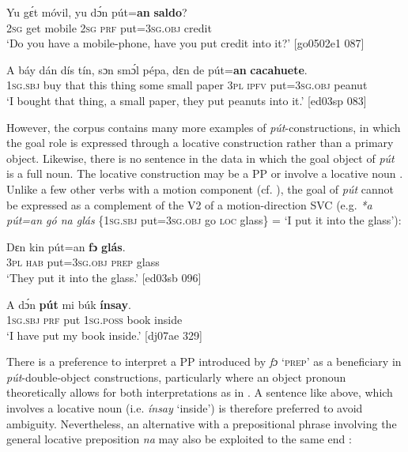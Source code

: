\ea%
    \label{ex:key:1215}
    \gll Yu  gɛ́t  móvil,  yu  dɔ́n    pút=\textbf{an}    \textbf{saldo}?\\
\textsc{2sg}  get  mobile  \textsc{2sg}  \textsc{prf}    put=\textsc{3sg.obj}  credit\\

\glt ‘Do you have a mobile-phone, have you put credit into it?’ [go0502e1 087]
\z


\ea%
    \label{ex:key:1216}
    \gll A    báy  dán  dís  tín,    sɔn    smɔ́l  pépa,
dɛn  de  pút=\textbf{an}    \textbf{cacahuete}.\\
\textsc{1sg.sbj}  buy  that  this  thing  some  small  paper
\textsc{3pl}  \textsc{ipfv}  put=\textsc{3sg.obj}  peanut\\

\glt ‘I bought that thing, a small paper, they put peanuts into it.’ [ed03sp 083]
\z

However, the corpus contains many more examples of \textit{pút}{}-constructions, in which the goal role is expressed through a locative construction rather than a primary object. Likewise, there is no sentence in the data in which the goal object of \textit{pút} is a full noun. The locative construction may be a PP  or involve a locative noun . Unlike a few other verbs with a motion component (cf. ), the goal of \textit{pút} cannot be expressed as a complement of the V2 of a motion-direction SVC (e.g. \textit{*a pút=an gó na glás} \{\textsc{1sg.sbj} put=\textsc{3sg.obj} go \textsc{loc} glass\} = ‘I put it into the glass’):


\ea%
    \label{ex:key:1217}
    \gll Dɛn  kin  pút=an    \textbf{fɔ}  \textbf{glás}.\\
\textsc{3pl}  \textsc{hab}  put=\textsc{3sg.obj}  \textsc{prep}  glass\\

\glt ‘They put it into the glass.’ [ed03sb 096]
\z


\ea%
    \label{ex:key:1218}
    \gll \MakeUppercase{A}   dɔ́n    \textbf{pút}  mi    búk    \textbf{ínsay}.\\
\textsc{1sg.sbj}  \textsc{prf}    put  \textsc{1sg.poss}  book  inside\\

\glt ‘I have put my book inside.’ [dj07ae 329]
\z

There is a preference to interpret a PP introduced by \textit{fɔ} ‘\textsc{prep}’ as a beneficiary in \textit{pút}{}-double-object constructions, particularly where an object pronoun theoretically allows for both interpretations as in . A sentence like  above, which involves a locative noun (i.e. \textit{ínsay} ‘inside’) is therefore preferred to avoid ambiguity. Nevertheless, an alternative with a prepositional phrase involving the general locative preposition \textit{na} may also be exploited to the same end : 



